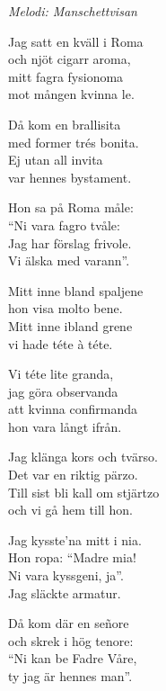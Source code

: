 {\footnotesize\textit{Melodi: Manschettvisan}}\par
\vspace{10pt}
Jag satt en kväll i Roma\\
och njöt cigarr aroma,\\
mitt fagra fysionoma\\
mot mången kvinna le.\par
\vspace{10pt}
Då kom en brallisita\\
med former trés bonita.\\
Ej utan all invita\\
var hennes bystament.\par
\vspace{10pt}
Hon sa på Roma måle:\\
``Ni vara fagro tvåle:\\
Jag har förslag frivole.\\
Vi älska med varann''.\par
\vspace{10pt}
Mitt inne bland spaljene\\
hon visa molto bene.\\
Mitt inne ibland grene\\
vi hade téte à téte.\par
\vspace{10pt}
Vi téte lite granda,\\
jag göra observanda\\
att kvinna confirmanda\\
hon vara långt ifrån.\par
\vspace{10pt}
Jag klänga kors och tvärso.\\
Det var en riktig pärzo.\\
Till sist bli kall om stjärtzo\\
och vi gå hem till hon.\par
\vspace{10pt}
Jag kysste'na mitt i nia.\\
Hon ropa: ``Madre mia!\\
Ni vara kyssgeni, ja''.\\
Jag släckte armatur.\par
\vspace{10pt}
Då kom där en señore\\
och skrek i hög tenore:\\
``Ni kan be Fadre Våre,\\
ty jag är hennes man''.\par
